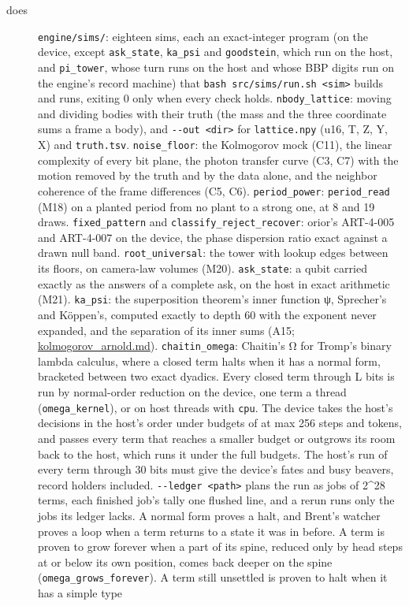 \begin{description}
\item[{does}] \texttt{engine/\allowbreak{}sims/\allowbreak{}}: eighteen sims, each an exact-integer program (on the device, except \texttt{ask\_\allowbreak{}state}, \texttt{ka\_\allowbreak{}psi} and \texttt{goodstein}, which run on the host, and \texttt{pi\_\allowbreak{}tower}, whose turn runs on the host and whose BBP digits run on the engine's record machine) that \texttt{bash src/\allowbreak{}sims/\allowbreak{}run.\allowbreak{}sh <sim>} builds and runs, exiting 0 only when every check holds. \texttt{nbody\_\allowbreak{}lattice}: moving and dividing bodies with their truth (the mass and the three coordinate sums a frame a body), and \texttt{-\allowbreak{}-\allowbreak{}out <dir>} for \texttt{lattice.\allowbreak{}npy} (u16, T, Z, Y, X) and \texttt{truth.\allowbreak{}tsv}. \texttt{noise\_\allowbreak{}floor}: the Kolmogorov mock (C11), the linear complexity of every bit plane, the photon transfer curve (C3, C7) with the motion removed by the truth and by the data alone, and the neighbor coherence of the frame differences (C5, C6). \texttt{period\_\allowbreak{}power}: \texttt{period\_\allowbreak{}read} (M18) on a planted period from no plant to a strong one, at 8 and 19 draws. \texttt{fixed\_\allowbreak{}pattern} and \texttt{classify\_\allowbreak{}reject\_\allowbreak{}recover}: orior's ART-4-005 and ART-4-007 on the device, the phase dispersion ratio exact against a drawn null band. \texttt{root\_\allowbreak{}universal}: the tower with lookup edges between its floors, on camera-law volumes (M20). \texttt{ask\_\allowbreak{}state}: a qubit carried exactly as the answers of a complete ask, on the host in exact arithmetic (M21). \texttt{ka\_\allowbreak{}psi}: the superposition theorem's inner function ψ, Sprecher's and Köppen's, computed exactly to depth 60 with the exponent never expanded, and the separation of its inner sums (A15; \hyperref[chap:kolmogorov-arnold]{kolmogorov\_\allowbreak{}arnold.md}). \texttt{chaitin\_\allowbreak{}omega}: Chaitin's Ω for Tromp's binary lambda calculus, where a closed term halts when it has a normal form, bracketed between two exact dyadics. Every closed term through L bits is run by normal-order reduction on the device, one term a thread (\texttt{omega\_\allowbreak{}kernel}), or on host threads with \texttt{cpu}. The device takes the host's decisions in the host's order under budgets of at max 256 steps and tokens, and passes every term that reaches a smaller budget or outgrows its room back to the host, which runs it under the full budgets. The host's run of every term through 30 bits must give the device's fates and busy beavers, record holders included. \texttt{-\allowbreak{}-\allowbreak{}ledger <path>} plans the run as jobs of 2\textasciicircum{}28 terms, each finished job's tally one flushed line, and a rerun runs only the jobs its ledger lacks. A normal form proves a halt, and Brent's watcher proves a loop when a term returns to a state it was in before. A term is proven to grow forever when a part of its spine, reduced only by head steps at or below its own position, comes back deeper on the spine (\texttt{omega\_\allowbreak{}grows\_\allowbreak{}forever}). A term still unsettled is proven to halt when it has a simple type 
\end{description}
